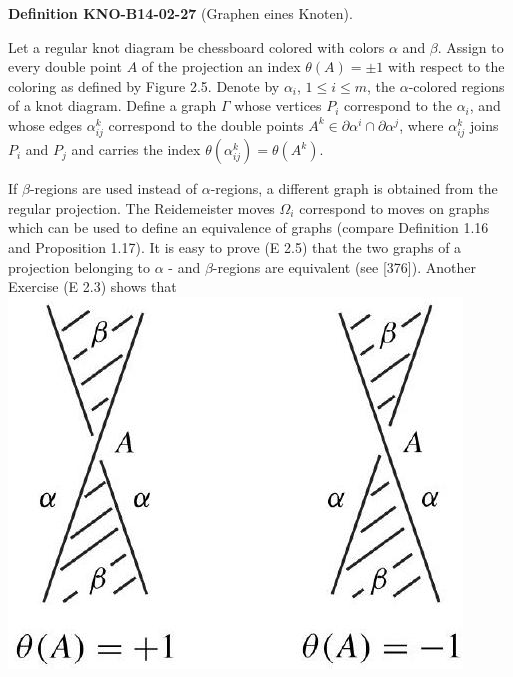\documentclass[10pt, letterpaper]{article}
\newcommand{\CustomHeading}[3]{%
  \par\medskip\noindent%
  \textbf{#1 #2} \textnormal{(#3)}.\enskip%
}
\newenvironment{DEF}[2]{\begin{unitbox}\CustomHeading{Definition}{#1}{#2}}{\end{unitbox}}
\begin{document}
\begin{DEF}{KNO-B14-02-27}{Graphen eines Knoten}
Let a regular knot diagram be chessboard colored with colors $\alpha$ and $\beta$. Assign to every double point $A$ of the projection an index $\theta(A)= \pm 1$ with respect to the coloring as defined by Figure 2.5. Denote by $\alpha_{i}$, $1 \leq i \leq m$, the $\alpha$-colored regions of a knot diagram. Define a graph $\Gamma$ whose vertices $P_{i}$ correspond to the $\alpha_{i}$, and whose edges $\alpha_{i j}^{k}$ correspond to the double points $A^{k} \in \partial \alpha^{i} \cap \partial \alpha^{j}$, where $\alpha_{i j}^{k}$ joins $P_{i}$ and $P_{j}$ and carries the index $\theta\left(\alpha_{i j}^{k}\right)=\theta\left(A^{k}\right)$.

If $\beta$-regions are used instead of $\alpha$-regions, a different graph is obtained from the regular projection. The Reidemeister moves $\Omega_{i}$ correspond to moves on graphs which can be used to define an equivalence of graphs (compare Definition 1.16 and Proposition 1.17). It is easy to prove (E 2.5) that the two graphs of a projection belonging to $\alpha$ - and $\beta$-regions are equivalent (see [376]). Another Exercise (E 2.3) shows that\\
\includegraphics[scale=0.2, center]{2025_05_21_9c06be8de7a55410f8c1g-032}


\end{DEF}
\end{document}
